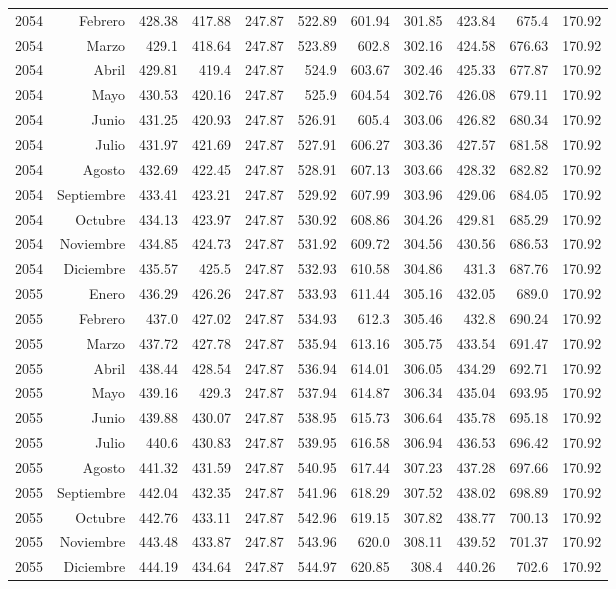 \documentclass{article}%
\begin{document}
\begin{longtable}{|l r|r|r|r|r|r|r|r|r|r|}
2054&Febrero&428.38&417.88&247.87&522.89&601.94&301.85&423.84&675.4&170.92\\%
2054&Marzo&429.1&418.64&247.87&523.89&602.8&302.16&424.58&676.63&170.92\\%
2054&Abril&429.81&419.4&247.87&524.9&603.67&302.46&425.33&677.87&170.92\\%
2054&Mayo&430.53&420.16&247.87&525.9&604.54&302.76&426.08&679.11&170.92\\%
2054&Junio&431.25&420.93&247.87&526.91&605.4&303.06&426.82&680.34&170.92\\%
2054&Julio&431.97&421.69&247.87&527.91&606.27&303.36&427.57&681.58&170.92\\%
2054&Agosto&432.69&422.45&247.87&528.91&607.13&303.66&428.32&682.82&170.92\\%
2054&Septiembre&433.41&423.21&247.87&529.92&607.99&303.96&429.06&684.05&170.92\\%
2054&Octubre&434.13&423.97&247.87&530.92&608.86&304.26&429.81&685.29&170.92\\%
2054&Noviembre&434.85&424.73&247.87&531.92&609.72&304.56&430.56&686.53&170.92\\%
2054&Diciembre&435.57&425.5&247.87&532.93&610.58&304.86&431.3&687.76&170.92\\%
2055&Enero&436.29&426.26&247.87&533.93&611.44&305.16&432.05&689.0&170.92\\%
2055&Febrero&437.0&427.02&247.87&534.93&612.3&305.46&432.8&690.24&170.92\\%
2055&Marzo&437.72&427.78&247.87&535.94&613.16&305.75&433.54&691.47&170.92\\%
2055&Abril&438.44&428.54&247.87&536.94&614.01&306.05&434.29&692.71&170.92\\%
2055&Mayo&439.16&429.3&247.87&537.94&614.87&306.34&435.04&693.95&170.92\\%
2055&Junio&439.88&430.07&247.87&538.95&615.73&306.64&435.78&695.18&170.92\\%
2055&Julio&440.6&430.83&247.87&539.95&616.58&306.94&436.53&696.42&170.92\\%
2055&Agosto&441.32&431.59&247.87&540.95&617.44&307.23&437.28&697.66&170.92\\%
2055&Septiembre&442.04&432.35&247.87&541.96&618.29&307.52&438.02&698.89&170.92\\%
2055&Octubre&442.76&433.11&247.87&542.96&619.15&307.82&438.77&700.13&170.92\\%
2055&Noviembre&443.48&433.87&247.87&543.96&620.0&308.11&439.52&701.37&170.92\\%
2055&Diciembre&444.19&434.64&247.87&544.97&620.85&308.4&440.26&702.6&170.92\\%

\end{longtable}
\end{document}
